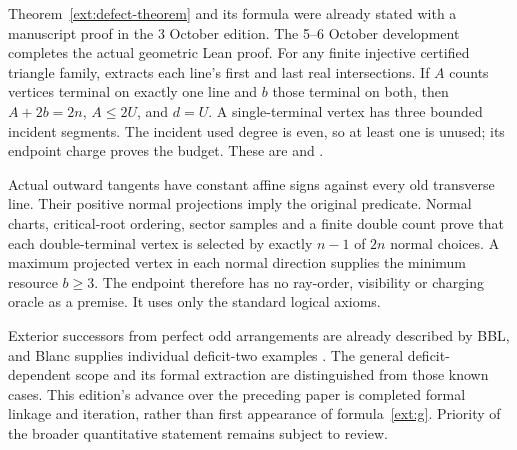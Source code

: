\begin{remark}
\label{ext:defect-scope}
Theorem~\ref{ext:defect-theorem} and its formula were already stated with
a manuscript proof in the 3 October edition. The 5--6 October development
completes the actual geometric Lean proof. For any finite injective
certified triangle family,  extracts each
line's first and last real intersections. If $A$ counts vertices terminal
on exactly one line and $b$ those terminal on both, then
$A+2b=2n$, $A\le2U$, and $d=U$. A single-terminal vertex has three
bounded incident segments. The incident used degree is even, so at
least one is unused; its endpoint charge proves the budget. These are
and .

Actual outward tangents have constant affine signs against every old
transverse line. Their positive normal projections imply the original
 predicate. Normal charts, critical-root
ordering, sector samples and a finite double count prove that each
double-terminal vertex is selected by exactly $n-1$ of $2n$ normal
choices. A maximum projected vertex in each normal direction supplies
the minimum resource $b\ge3$. The endpoint
therefore has no ray-order, visibility or charging oracle as a premise.
It uses only the standard logical axioms.

Exterior successors from perfect odd arrangements are already described
by BBL, and Blanc supplies individual deficit-two examples
\cite{bbl2008,blanc2011}. The general deficit-dependent scope and its
formal extraction are distinguished from those known cases. This
edition's advance over the preceding paper is completed formal linkage
and iteration, rather than first appearance of formula~\eqref{ext:g}.
Priority of the broader quantitative statement remains subject to review.
\end{remark}

